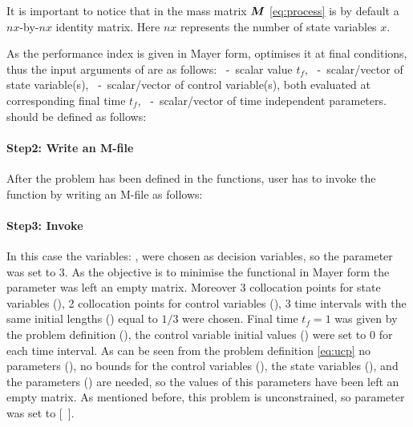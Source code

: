{\small }

It is important to notice that in  the mass matrix
$\ve{M}$ \eqref{eq:process} is by default a $nx$-by-$nx$ identity
matrix. Here $nx$ represents the number of state variables $x$. 

As the performance index is given in Mayer form,  
optimises it at final conditions, thus the input arguments of
 are as follows: ~-~scalar value $t_{f}$,
~-~scalar/vector of state variable(s),
~-~scalar/vector of control variable(s), both evaluated at
corresponding  final time $t_{f}$, ~-~scalar/vector of time
independent parameters.  should be defined as follows:

\paragraph{Step2: Write an M-file~}

{\small }

After the problem has been defined in the functions, user has to invoke
the  function by writing an M-file  as
follows:

\paragraph{Step3: Invoke~}

{\small }

In this case the variables: ,  were chosen as
decision variables, so the parameter  was
set to 3. As the objective is to minimise the functional in Mayer form
the parameter  was left an empty
matrix. Moreover 3 collocation points for state variables
(), 2 collocation points for control
variables (), 3 time intervals with the same
initial lengths () equal to $1/3$ were
chosen. Final time $t_f = 1$ was given by the problem definition
(), the control variable initial values
() were set to 0 for each time interval. As can
be seen from the problem definition \eqref{eq:ucp} no parameters
(), no bounds for the control variables 
(), the state variables (),
and the parameters () are needed, so the values
of this parameters have been left an empty matrix. As mentioned before,
this problem is unconstrained, so parameter 
was set to [~].

